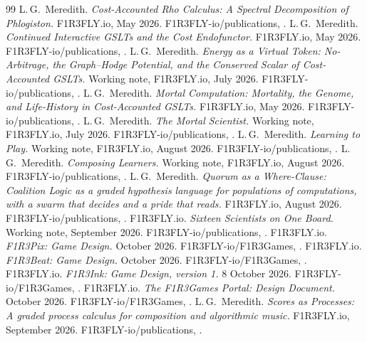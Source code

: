 \documentclass[11pt,a4paper]{article}
\begin{document}
\begingroup\small\raggedright
\begin{thebibliography}{99}\setlength{\itemsep}{2pt}
 L.\,G.\ Meredith. \emph{Cost-Accounted Rho Calculus: A Spectral Decomposition
  of Phlogiston.} F1R3FLY.io, May 2026. F1R3FLY-io/publications, .
 L.\,G.\ Meredith. \emph{Continued Interactive GSLTs and the Cost Endofunctor.}
  F1R3FLY.io, May 2026. F1R3FLY-io/publications, .
 L.\,G.\ Meredith. \emph{Energy as a Virtual Token: No-Arbitrage, the
  Graph--Hodge Potential, and the Conserved Scalar of Cost-Accounted GSLTs.} Working note,
  F1R3FLY.io, July 2026. F1R3FLY-io/publications, .
 L.\,G.\ Meredith. \emph{Mortal Computation: Mortality, the Genome, and
  Life-History in Cost-Accounted GSLTs.} F1R3FLY.io, May 2026. F1R3FLY-io/publications,
  .
 L.\,G.\ Meredith. \emph{The Mortal Scientist.} Working note,
  F1R3FLY.io, July 2026. F1R3FLY-io/publications, .
 L.\,G.\ Meredith. \emph{Learning to Play.} Working note, F1R3FLY.io,
  August 2026. F1R3FLY-io/publications, .
 L.\,G.\ Meredith. \emph{Composing Learners.} Working note, F1R3FLY.io,
  August 2026. F1R3FLY-io/publications, .
 L.\,G.\ Meredith. \emph{Quorum as a Where-Clause: Coalition Logic as a graded
  hypothesis language for populations of computations, with a swarm that decides and a pride that
  reads.} F1R3FLY.io, August 2026. F1R3FLY-io/publications, .
 F1R3FLY.io. \emph{Sixteen Scientists on One Board.} Working note, September
  2026. F1R3FLY-io/publications, .
 F1R3FLY.io. \emph{F1R3Pix: Game Design.} October 2026. F1R3FLY-io/F1R3Games,
  .
 F1R3FLY.io. \emph{F1R3Beat: Game Design.} October 2026.
  F1R3FLY-io/F1R3Games, .
 F1R3FLY.io. \emph{F1R3Ink: Game Design, version 1.} 8 October 2026.
  F1R3FLY-io/F1R3Games, .
 F1R3FLY.io. \emph{The F1R3Games Portal: Design Document.} October 2026.
  F1R3FLY-io/F1R3Games, .
 L.\,G.\ Meredith. \emph{Scores as Processes: A graded process calculus for composition and
  algorithmic music.} F1R3FLY.io, September 2026. F1R3FLY-io/publications, .

\end{thebibliography}
\end{document}
